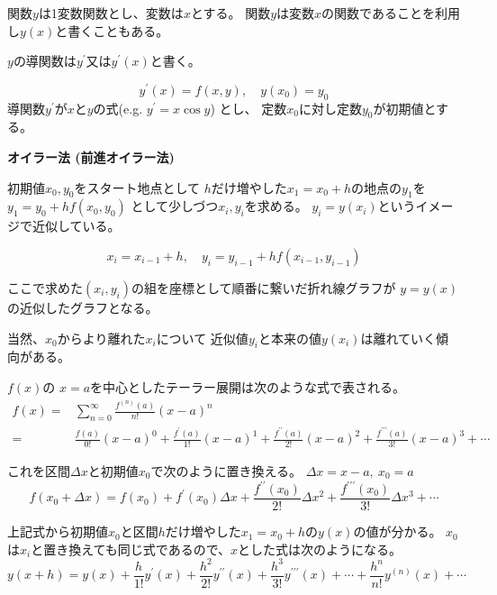\documentclass[12pt,b5paper]{ltjsarticle}
\begin{document}
\hrulefill


関数$y$は1変数関数とし、変数は$x$とする。
関数$y$は変数$x$の関数であることを利用し$y(x)$と書くこともある。

$y$の導関数は$y^{\prime}$又は$y^{\prime}(x)$と書く。

\begin{equation}
 y^{\prime}(x) = f(x,y),
  \quad y(x_0)=y_0
\end{equation}
導関数$y^{\prime}$が$x$と$y$の式(e.g. $y^{\prime}=x\cos y$)
とし、
定数$x_0$に対し定数$y_0$が初期値とする。




\dotfill
\textbf{オイラー法 (前進オイラー法)}
\dotfill

初期値$x_0,y_0$をスタート地点として
$h$だけ増やした$x_1 = x_0 + h$の地点の$y_1$を
$y_1 = y_0 + h f(x_0,y_0)$
として少しづつ$x_i,y_i$を求める。
$y_i=y(x_i)$というイメージで近似している。

\begin{equation}
 x_i = x_{i-1} + h, \quad
 y_{i} = y_{i-1} + hf(x_{i-1},y_{i-1})
\end{equation}

ここで求めた$(x_i,y_i)$の組を座標として順番に繋いだ折れ線グラフが
$y=y(x)$の近似したグラフとなる。

当然、$x_0$からより離れた$x_i$について
近似値$y_i$と本来の値$y(x_i)$は離れていく傾向がある。

\dotfill

$f(x)$の
$x=a$を中心としたテーラー展開は次のような式で表される。
\begin{align}
 f(x) =& \sum_{n=0}^{\infty} \frac{f^{(n)}(a)}{n!}(x-a)^{n}\\
  =& \frac{f(a)}{0!}(x-a)^0 + \frac{f^{\prime}(a)}{1!}(x-a)^1
  + \frac{f^{\prime\prime}(a)}{2!}(x-a)^2
  + \frac{f^{\prime\prime\prime}(a)}{3!}(x-a)^3
  + \cdots
\end{align}

これを区間$\Delta x$と初期値$x_0$で次のように置き換える。
$\Delta x = x-a , \ x_0 = a$
\begin{equation}
 f(x_0 + \Delta x)
  = f(x_0) + f^{\prime}(x_0)\Delta x
  + \frac{f^{\prime\prime}(x_0)}{2!}\Delta x^2
  + \frac{f^{\prime\prime\prime}(x_0)}{3!}\Delta x^3
  + \cdots
\end{equation}

上記式から初期値$x_0$と区間$h$だけ増やした$x_1=x_0+h$の$y(x)$の値が分かる。
$x_0$は$x_i$と置き換えても同じ式であるので、$x$とした式は次のようになる。
\begin{equation}
 y(x+h) = y(x) + \frac{h}{1!}y^{\prime}(x) + \frac{h^2}{2!}y^{\prime\prime}(x)
  + \frac{h^3}{3!}y^{\prime\prime\prime}(x) + \cdots
  + \frac{h^n}{n!}y^{(n)}(x) + \cdots
\end{equation}
\end{document}
